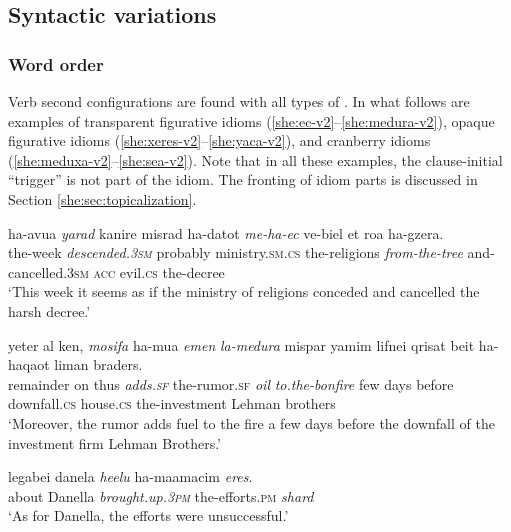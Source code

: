 \documentclass[output=paper]{langsci/langscibook}
\begin{document}
\subsection{Syntactic variations}
\label{she:sec:sv}

\subsubsection{Word order}
\label{she:sec:order}

Verb second configurations are found with all types of . In what follows are examples of transparent figurative idioms (\ref{she:ec-v2}--\ref{she:medura-v2}), opaque figurative idioms (\ref{she:xeres-v2}--\ref{she:yaca-v2}), and cranberry idioms (\ref{she:meduxa-v2}--\ref{she:sea-v2}). Note that in all these examples, the clause-initial ``trigger'' is not part of the idiom. The fronting of idiom parts is discussed in Section \ref{she:sec:topicalization}.

    \ea\label{she:ec-v2}
        \gll ha-{\shin}avu{\ayin}a \textit{yarad} kanir{\alef}e misrad ha-datot \textit{me-ha-{\ayin}ec} ve-bi{\tet}el {\alef}et ro{\ayin}a ha-gzera.\\
            the-week \textit{descended.\textsc{3sm}} probably ministry.\textsc{sm}.\textsc{cs} the-religions \textit{from-the-tree} and-cancelled.\textsc{3sm} \textsc{acc} evil.\textsc{cs} the-decree \\
        \glt `This week it seems as if the ministry of religions conceded and cancelled the harsh decree.'
    \z

    \ea\label{she:medura-v2}
        \gll yeter {\ayin}al ken, \textit{mosifa} ha-{\shin}mu{\ayin}a \textit{{\shin}emen} \textit{la-medura} mispar yamim lifnei qrisat beit ha-ha{\shin}qa{\ayin}ot liman braders.\\
            remainder on thus \textit{adds.\textsc{sf}} the-rumor.\textsc{sf} \textit{oil} \textit{to.the-bonfire} few days before downfall.\textsc{cs} house.\textsc{cs} the-investment Lehman brothers\\
        \glt `Moreover, the rumor adds fuel to the fire a few days before the downfall of the investment firm Lehman Brothers.'
    \z

    \ea\label{she:xeres-v2}
        \gll legabei danela \textit{he{\ayin}elu} ha-ma{\alef}amacim \textit{{\het}eres}.\\
            about Danella \textit{brought.up.\textsc{3pm}} the-efforts.\textsc{pm} \textit{shard}\\
        \glt `As for Danella, the efforts were unsuccessful.'
    \z
\end{document}
